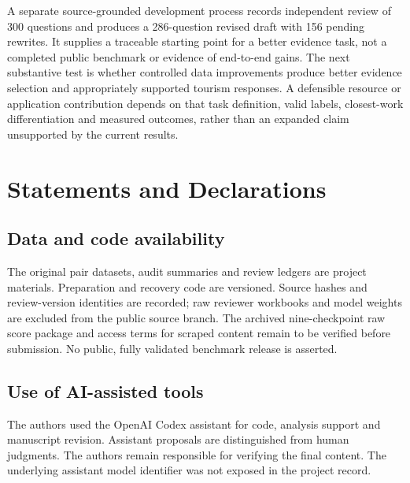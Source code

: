 \documentclass[pdflatex,sn-basic]{sn-jnl}
\begin{document}
A separate source-grounded development process records independent review of
300 questions and produces a 286-question revised draft with 156 pending
rewrites. It supplies a traceable starting point for a better evidence task,
not a completed public benchmark or evidence of end-to-end gains. The next
substantive test is whether controlled data improvements produce better evidence
selection and appropriately supported tourism responses. A defensible resource
or application contribution depends on that task definition, valid labels,
closest-work differentiation and measured outcomes, rather than an expanded
claim unsupported by the current results.


\section*{Statements and Declarations}
\subsection*{Data and code availability}
The original pair datasets, audit summaries and review ledgers are project
materials. Preparation and recovery code are versioned. Source hashes and
review-version identities are recorded; raw reviewer workbooks and model
weights are excluded from the public source branch. The archived nine-checkpoint
raw score package and access terms for scraped content remain to be verified
before submission. No public, fully validated benchmark release is asserted.
\subsection*{Use of AI-assisted tools}
The authors used the OpenAI Codex assistant for code, analysis support and
manuscript revision. Assistant proposals are distinguished from human judgments.
The authors remain responsible for verifying the final content. The underlying
assistant model identifier was not exposed in the project record.

\end{document}
